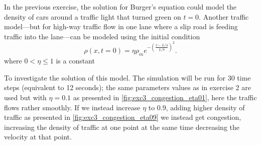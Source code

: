 In the previous exercise, the solution for Burger's equation could model the density of cars around a traffic light that turned green on $t=0$.
Another traffic model---but for high-way traffic flow in one lane where a slip road is feeding traffic into the lane---can be modeled using the initial condition
\begin{equation}\label{eq:exc3_pinit}
\rho(x, t=0) = \eta \rho_m e^{-\left(\frac{x-L/4}{L/8}\right)^2}.
\end{equation}
where $0 < \eta \le 1$ is a constant

To investigate the solution of this model. The simulation will be run for 30 time steps (equivalent to 12 seconds); the same parameters values as in exercise 2 are used but with $\eta = 0.1$ as presented in \ref{fig:exc3_congestion_eta01}, here the traffic flows rather smoothly.
If we instead increase $\eta$ to 0.9, adding higher density of traffic as presented in 
\ref{fig:exc3_congestion_eta09} we instead get congestion, increasing the density of traffic at one point at the same time decreasing the velocity at that point.


